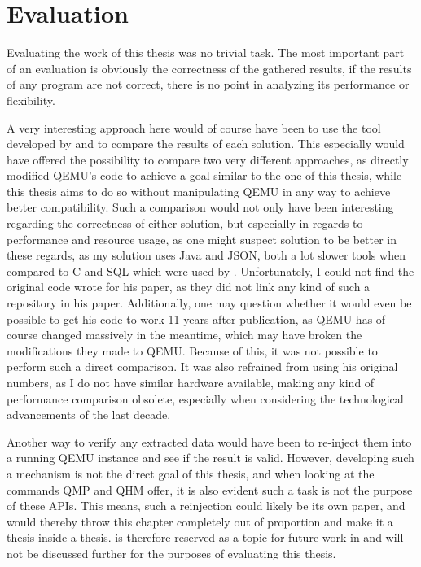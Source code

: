 
\chapter{Evaluation}\label{chap:Evaluation}
Evaluating the work of this thesis was no trivial task.
The most important part of an evaluation is obviously the correctness of the gathered results,
if the results of any program are not correct, there is no point in analyzing its performance or flexibility.

A very interesting approach here would of course have been to use the tool developed by \citeauthor{kitcheckpoints}
and to compare the results of each solution.
This especially would have offered the possibility to compare two very different approaches,
as \citeauthor{kitcheckpoints} directly modified QEMU's code to achieve a goal similar to the one of this thesis,
while this thesis aims to do so without manipulating QEMU in any way to achieve better compatibility.
Such a comparison would not only have been interesting regarding the correctness of either solution,
but especially in regards to performance and resource usage,
as one might suspect \citeauthor{kitcheckpoints} solution to be better in these regards,
as my solution uses Java and JSON, both a lot slower tools when compared to C and SQL which were used by \citeauthor{kitcheckpoints}.
Unfortunately, I could not find the original code \citeauthor{kitcheckpoints} wrote for his paper,
as they did not link any kind of such a repository in his paper.
Additionally, one may question whether it would even be possible to get his code to work 11 years after publication,
as QEMU has of course changed massively in the meantime, which may have broken the modifications they made to QEMU.
Because of this, it was not possible to perform such a direct comparison.
It was also refrained from using his original numbers,
as I do not have similar hardware available,
making any kind of performance comparison obsolete,
especially when considering the technological advancements of the last decade\cite{kitcheckpoints}.

Another way to verify any extracted data would have been to re-inject them into a running QEMU instance and see if the result is valid.
However, developing such a mechanism is not the direct goal of this thesis,
and when looking at the commands QMP and QHM offer, it is also evident such a task is not the purpose of these APIs.
This means, such a reinjection could likely be its own paper,
and would thereby throw this chapter completely out of proportion
and make it a thesis inside a thesis.
 is therefore reserved as a topic for future work in 
and will not be discussed further for the purposes of evaluating this thesis.

